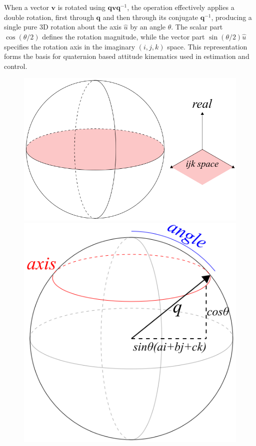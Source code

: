 \\ \\
When a vector $\mathbf{v}$ is rotated using $\mathbf{q}\mathbf{v}\mathbf{q}^{-1}$, the operation effectively applies a double rotation, first through $\mathbf{q}$ and then through its conjugate $\mathbf{q}^{-1}$, producing a single pure 3D rotation about the axis $\hat{u}$ by an angle $\theta$. The scalar part $\cos(\theta/2)$ defines the rotation magnitude, while the vector part $\sin(\theta/2)\hat{u}$ specifies the rotation axis in the imaginary $(i, j, k)$ space. This representation forms the basis for quaternion based attitude kinematics used in estimation and control.
\begin{figure}[H]
    \centering
    \begin{minipage}[b]{0.45\linewidth}
        \centering
        \includegraphics[width=\linewidth]{Pictures/System_Modeling/Orientation_Representations/quaternion_pic1.png}
    \end{minipage}
    \hfill
    \begin{minipage}[b]{0.32\linewidth}
        \centering
        \includegraphics[width=\linewidth]{Pictures/System_Modeling/Orientation_Representations/quaternion_pic2.png}

\end{minipage}
\end{figure}
